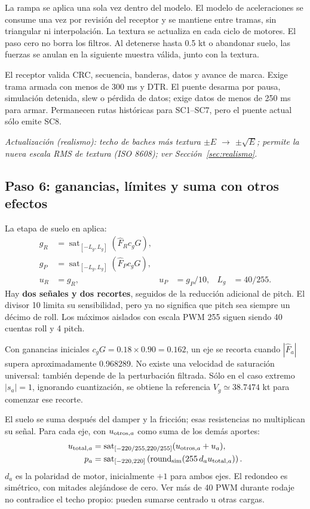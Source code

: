 \documentclass[11pt,a4paper]{article}
\newcommand{\code}[1]{\texttt{\detokenize{#1}}}
\newcommand{\sat}{\operatorname{sat}}
\begin{document}
La rampa se aplica una sola vez dentro del modelo. El modelo de aceleraciones se consume una vez por revisión del receptor y se mantiene entre tramas, sin triangular ni interpolación. La textura se actualiza en cada ciclo de motores. El paso cero no borra los filtros. Al detenerse hasta 0.5 kt o abandonar suelo, las fuerzas se anulan en la siguiente muestra válida, junto con la textura.

El receptor valida CRC, secuencia, banderas, datos y avance de marca. Exige trama armada con menos de 300 ms y DTR. El puente desarma por pausa, simulación detenida, slew o pérdida de datos; exige datos de menos de 250 ms para armar. Permanecen rutas históricas para SC1--SC7, pero el puente actual sólo emite SC8.

\textit{Actualización (realismo): techo de baches más textura $\pm E$ $\rightarrow$ $\pm\sqrt E$; permite la nueva escala RMS de textura (ISO 8608); ver Sección~\ref{sec:realismo}.}

\subsection{Paso 6: ganancias, límites y suma con otros efectos}
La etapa de suelo en \code{Effects::command} aplica:
\begin{align}
g_R&=\sat_{[-L_g,L_g]}(\widehat F_R c_g G),\\
g_P&=\sat_{[-L_g,L_g]}(\widehat F_P c_g G),\\
u_R&=g_R, & u_P&=g_P/10, & L_g&=40/255.
\label{eq:ground-gains}
\end{align}
Hay \textbf{dos señales y dos recortes}, seguidos de la reducción adicional de pitch. El divisor 10 limita su sensibilidad, pero ya no significa que pitch sea siempre un décimo de roll. Los máximos aislados con escala PWM 255 siguen siendo 40 cuentas roll y 4 pitch.

Con ganancias iniciales $c_gG=0.18\times0.90=0.162$, un eje se recorta cuando $|\widehat F_a|$ supera aproximadamente 0.968289. No existe una velocidad de saturación universal: también depende de la perturbación filtrada. Sólo en el caso extremo $|s_a|=1$, ignorando cuantización, se obtiene la referencia $V_g\simeq38.7474$ kt para comenzar ese recorte.

El suelo se suma después del damper y la fricción; esas resistencias no multiplican su señal. Para cada eje, con $u_{{\rm otros},a}$ como suma de los demás aportes:
\begin{align}
u_{{\rm total},a}&=\sat_{[-220/255,220/255]}(u_{{\rm otros},a}+u_a),\\
p_a&=\sat_{[-220,220]}\left(\operatorname{round}_{\rm sim}(255\,d_a u_{{\rm total},a})\right).
\end{align}
$d_a$ es la polaridad de motor, inicialmente $+1$ para ambos ejes. El redondeo es simétrico, con mitades alejándose de cero. Ver más de 40 PWM durante rodaje no contradice el techo propio: pueden sumarse centrado u otras cargas.
\end{document}
